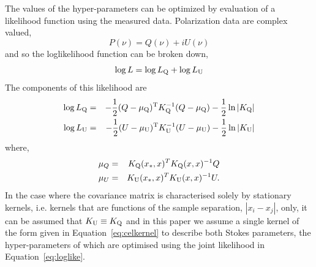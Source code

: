 \documentclass[fleqn,usenatbib]{mnras}
\begin{document}
The values of the hyper-parameters can be optimized by evaluation of a likelihood function using the measured data. Polarization data are complex valued,
%
\begin{equation}
P(\nu) = Q(\nu) + iU(\nu)
\end{equation}
%
and so the loglikelihood function can be broken down,
%
\begin{equation}
\label{eq:loglike}
\log L = \log L_{\rm Q} + \log L_{\rm U}
\end{equation}
%
The components of this likelihood are
%
\begin{eqnarray}
\log L_{\rm Q} &=& -\frac{1}{2}(Q - \mu_{\rm Q})^{\rm T}K_{\rm Q}^{-1}(Q - \mu_{\rm Q}) - \frac{1}{2}\ln |K_{\rm Q}|\\
\log L_{\rm U} &=& -\frac{1}{2}(U - \mu_{\rm U})^{\rm T}K_{\rm U}^{-1}(U - \mu_{\rm U}) - \frac{1}{2}\ln |K_{\rm U}|
\end{eqnarray}
%
where,
%
\begin{eqnarray}
\mu_{Q} &=& K_{\rm Q}(x_{\ast},x)^T K_{\rm Q}(x,x)^{-1} Q\\
\mu_{U} &=& K_{\rm U}(x_{\ast},x)^T K_{\rm U}(x,x)^{-1} U.
\end{eqnarray}
%
In the case where the covariance matrix is characterised solely by stationary kernels, i.e. kernels that are functions of the sample separation, $|x_i - x_j|$, only, it can be assumed that $K_{\rm U}\equiv K_{\rm Q}$ and in this paper we assume a single kernel of the form given in Equation~\ref{eq:celkernel} to describe both Stokes parameters, the hyper-parameters of which are optimised using the joint likelihood in Equation~\ref{eq:loglike}.


\end{document}
